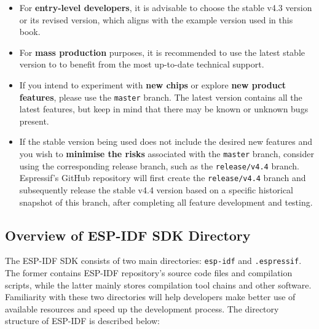 \documentclass[a4paper,12pt]{book}
\begin{document}
\begin{itemize}[leftmargin=1.5em]
    \item For \textbf{entry-level developers}, it is advisable to choose the stable v4.3 version or its revised version, which aligns with the example version used in this book.
    \item For \textbf{mass production} purposes, it is recommended to use the latest stable version to to benefit from the most up-to-date technical support.
    \item If you intend to experiment with \textbf{new chips} or explore \textbf{new product features}, please use the \verb|master| branch. The latest version contains all the latest features, but keep in mind that there may be known or unknown bugs present.
    \item If the stable version being used does not include the desired new features and you wish to \textbf{minimise the risks} associated with the \verb|master| branch, consider using the corresponding release branch, such as the \verb|release/v4.4| branch. Espressif’s GitHub repository will first create the \verb|release/v4.4| branch and subsequently release the stable v4.4 version based on a specific historical snapshot of this branch, after completing all feature development and testing.
\end{itemize}

\subsection{Overview of ESP-IDF SDK Directory}
The ESP-IDF SDK consists of two main directories: \verb|esp-idf| and \verb|.espressif|. The former contains ESP-IDF repository’s source code files and compilation scripts, while the latter mainly stores compilation tool chains and other software. Familiarity with these two directories will help developers make better use of available resources and speed up the development process. The directory structure of ESP-IDF is described below:
\end{document}
